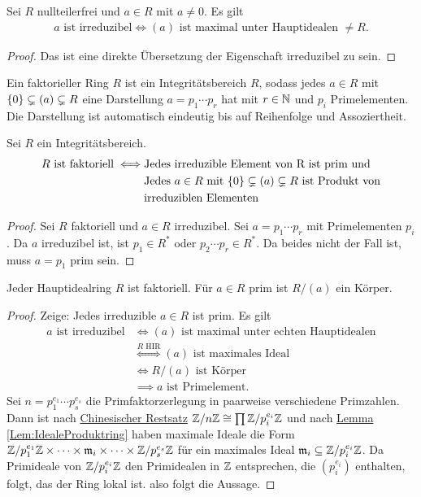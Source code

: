 \begin{Lemma}
    Sei \(R\) nullteilerfrei und \(a\in R\) mit \(a\neq 0\). Es gilt 
    \begin{align*}
        a \text{ ist irreduzibel} \iff (a) \text{ ist maximal unter Hauptidealen \(\neq R\).}
    \end{align*}
\end{Lemma}
\begin{proof}
    Das ist eine direkte Übersetzung der Eigenschaft irreduzibel zu sein.
\end{proof}
\begin{Def}
    Ein faktorieller Ring \(R\) ist ein Integritätsbereich \(R\), sodass jedes \(a\in R\) mit \(\{0\}\subsetneq (a)\subsetneq R\) eine Darstellung \(a=p_1\cdots p_r\) hat mit \(r\in\mathbb{N}\) und \(p_i\) Primelementen. Die Darstellung ist automatisch eindeutig bis auf Reihenfolge und Assoziertheit.
\end{Def}
\begin{Lemma}
    Sei \(R\) ein Integritätsbereich. 
    \begin{align*}
        R \text{ ist faktoriell} \iff& \text{Jedes irreduzible Element von R ist prim und}\\
        & \text{Jedes \(a\in R\) mit \(\{0\}\subsetneq (a)\subsetneq R\) ist Produkt von}\\
        &\text{irreduziblen Elementen}
    \end{align*}
\end{Lemma}
\begin{proof}
    Sei \(R\) faktoriell und \(a\in R\) irreduzibel. Sei \(a=p_1\cdots p_r\) mit Primelementen \(p_i\). Da \(a\) irreduzibel ist, ist \(p_1\in R^*\) oder \(p_2\cdots p_r\in R^*\). Da beides nicht der Fall ist, muss \(a=p_1\) prim sein.
\end{proof}
\begin{Satz}
    Jeder Hauptidealring \(R\) ist faktoriell. Für \(a\in R\) prim ist \(R/(a)\) ein Körper.
\end{Satz}
\begin{proof}
    Zeige: Jedes irreduzible \(a\in R\) ist prim. Es gilt 
    \begin{align*}
        a \text{ ist irreduzibel} &\iff (a) \text{ ist maximal unter echten Hauptidealen}\\
        &\stackrel{R \text{ HIR}}\iff (a) \text{ ist maximales Ideal}\\
        &\iff R/(a) \text{ ist Körper}\\
        &\implies a \text{ ist Primelement.}
    \end{align*}
    Sei \(n=p_1^{e_1}\cdots p_s^{e_s}\) die Primfaktorzerlegung in paarweise verschiedene Primzahlen. Dann ist nach \hyperref[Lem:ChinRest1]{Chinesischer Restsatz} \(\mathbb{Z}/n\mathbb{Z}\cong \prod \mathbb{Z}/p_i^{e_i}\mathbb{Z}\) und nach \hyperref[Lem:IdealeProduktring]{Lemma \ref{Lem:IdealeProduktring}} haben maximale Ideale die Form \(\mathbb{Z}/p_1^{e_1}\mathbb{Z}\times\dots\times \mathfrak{m}_i\times\dots\times \mathbb{Z}/p_s^{e_s}\mathbb{Z}\) für ein maximales Ideal \(\mathfrak{m}_i \subseteq \mathbb{Z}/p_i^{e_i}\mathbb{Z}\).
    Da Primideale von \(\mathbb{Z}/p_i^{e_i}\mathbb{Z}\) den Primidealen in \(\mathbb{Z}\) entsprechen, die \((p_i^{e_i})\) enthalten, folgt, das der Ring lokal ist. also folgt die Aussage.
\end{proof}

